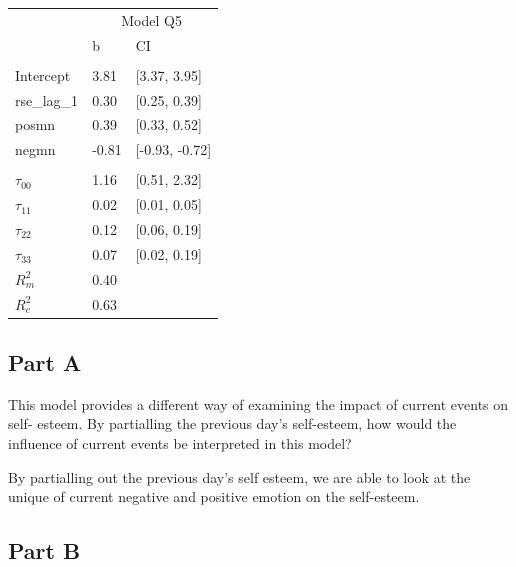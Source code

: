\documentclass[]{article}
\begin{document}
\begin{table}[H]
\centering
\begin{tabular}{lll}
\toprule
\multicolumn{1}{c}{ } & \multicolumn{2}{c}{Model Q5} \\
\cmidrule(l{2pt}r{2pt}){2-3}
 & b & CI\\
\midrule
\addlinespace[0.3em]
\multicolumn{3}{l}{\textbf{Fixed}}\\
\hspace{1em}Intercept & 3.81 & [3.37, 3.95]\\
\hspace{1em}rse\_lag\_1 & 0.30 & [0.25, 0.39]\\
\hspace{1em}posmn & 0.39 & [0.33, 0.52]\\
\hspace{1em}negmn & -0.81 & [-0.93, -0.72]\\
\addlinespace[0.3em]
\multicolumn{3}{l}{\textbf{Random}}\\
\hspace{1em}$\tau_{00}$ & 1.16 & [0.51, 2.32]\\
\hspace{1em}$\tau_{11}$ & 0.02 & [0.01, 0.05]\\
\hspace{1em}$\tau_{22}$ & 0.12 & [0.06, 0.19]\\
\hspace{1em}$\tau_{33}$ & 0.07 & [0.02, 0.19]\\
$R^2_m$ & 0.40 & \\
$R^2_c$ & 0.63 & \\
\bottomrule
\end{tabular}
\end{table}

\subsection{Part A}\label{part-a-3}

This model provides a different way of examining the impact of current
events on self- esteem. By partialling the previous day's self-esteem,
how would the influence of current events be interpreted in this model?

By partialling out the previous day's self esteem, we are able to look
at the unique of current negative and positive emotion on the
self-esteem.

\subsection{Part B}\label{part-b-3}
\end{document}

